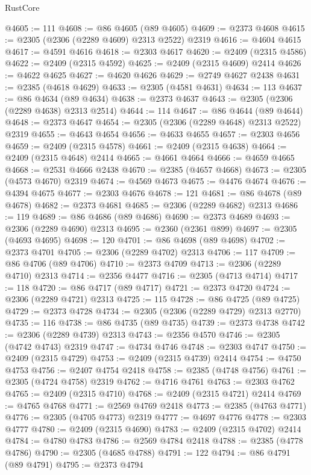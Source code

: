 \begin{lexlean}{RustCore}
\begin{coremodule}
@4605 := 111
@4608 := @86 @4605 (@89 @4605)
@4609 := @2373 @4608
@4615 := @2305 (@2306 (@2289 @4609) @2313 @2522) @2319
@4616 := @4604 @4615
@4617 := @4591 @4616
@4618 := @2303 @4617
@4620 := @2409 (@2315 @4586)
@4622 := @2409 (@2315 @4592)
@4625 := @2409 (@2315 @4609) @2414
@4626 := @4622 @4625
@4627 := @4620 @4626
@4629 := @2749 @4627 @2438
@4631 := @2385 (@4618 @4629)
@4633 := @2305 (@4581 @4631)
@4634 := 113
@4637 := @86 @4634 (@89 @4634)
@4638 := @2373 @4637
@4643 := @2305 (@2306 (@2289 @4638) @2313 @2514)
@4644 := 114
@4647 := @86 @4644 (@89 @4644)
@4648 := @2373 @4647
@4654 := @2305 (@2306 (@2289 @4648) @2313 @2522) @2319
@4655 := @4643 @4654
@4656 := @4633 @4655
@4657 := @2303 @4656
@4659 := @2409 (@2315 @4578)
@4661 := @2409 (@2315 @4638)
@4664 := @2409 (@2315 @4648) @2414
@4665 := @4661 @4664
@4666 := @4659 @4665
@4668 := @2531 @4666 @2438
@4670 := @2385 (@4657 @4668)
@4673 := @2305 (@4573 @4670) @2319
@4674 := @4569 @4673
@4675 := @4476 @4674
@4676 := @4394 @4675
@4677 := @2303 @4676
@4678 := 121
@4681 := @86 @4678 (@89 @4678)
@4682 := @2373 @4681
@4685 := @2306 (@2289 @4682) @2313
@4686 := 119
@4689 := @86 @4686 (@89 @4686)
@4690 := @2373 @4689
@4693 := @2306 (@2289 @4690) @2313
@4695 := @2360 (@2361 @899)
@4697 := @2305 (@4693 @4695)
@4698 := 120
@4701 := @86 @4698 (@89 @4698)
@4702 := @2373 @4701
@4705 := @2306 (@2289 @4702) @2313
@4706 := 117
@4709 := @86 @4706 (@89 @4706)
@4710 := @2373 @4709
@4713 := @2306 (@2289 @4710) @2313
@4714 := @2356 @4477
@4716 := @2305 (@4713 @4714)
@4717 := 118
@4720 := @86 @4717 (@89 @4717)
@4721 := @2373 @4720
@4724 := @2306 (@2289 @4721) @2313
@4725 := 115
@4728 := @86 @4725 (@89 @4725)
@4729 := @2373 @4728
@4734 := @2305 (@2306 (@2289 @4729) @2313 @2770)
@4735 := 116
@4738 := @86 @4735 (@89 @4735)
@4739 := @2373 @4738
@4742 := @2306 (@2289 @4739) @2313
@4743 := @2356 @4570
@4746 := @2305 (@4742 @4743) @2319
@4747 := @4734 @4746
@4748 := @2303 @4747
@4750 := @2409 (@2315 @4729)
@4753 := @2409 (@2315 @4739) @2414
@4754 := @4750 @4753
@4756 := @2407 @4754 @2418
@4758 := @2385 (@4748 @4756)
@4761 := @2305 (@4724 @4758) @2319
@4762 := @4716 @4761
@4763 := @2303 @4762
@4765 := @2409 (@2315 @4710)
@4768 := @2409 (@2315 @4721) @2414
@4769 := @4765 @4768
@4771 := @2569 @4769 @2418
@4773 := @2385 (@4763 @4771)
@4776 := @2305 (@4705 @4773) @2319
@4777 := @4697 @4776
@4778 := @2303 @4777
@4780 := @2409 (@2315 @4690)
@4783 := @2409 (@2315 @4702) @2414
@4784 := @4780 @4783
@4786 := @2569 @4784 @2418
@4788 := @2385 (@4778 @4786)
@4790 := @2305 (@4685 @4788)
@4791 := 122
@4794 := @86 @4791 (@89 @4791)
@4795 := @2373 @4794

\end{coremodule}
\end{lexlean}
